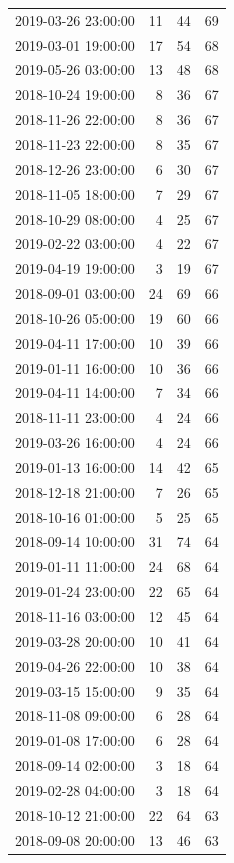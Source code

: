 \begin{tabular}{lrrr}
2019-03-26 23:00:00 & 11 & 44 & 69 \\
2019-03-01 19:00:00 & 17 & 54 & 68 \\
2019-05-26 03:00:00 & 13 & 48 & 68 \\
2018-10-24 19:00:00 & 8 & 36 & 67 \\
2018-11-26 22:00:00 & 8 & 36 & 67 \\
2018-11-23 22:00:00 & 8 & 35 & 67 \\
2018-12-26 23:00:00 & 6 & 30 & 67 \\
2018-11-05 18:00:00 & 7 & 29 & 67 \\
2018-10-29 08:00:00 & 4 & 25 & 67 \\
2019-02-22 03:00:00 & 4 & 22 & 67 \\
2019-04-19 19:00:00 & 3 & 19 & 67 \\
2018-09-01 03:00:00 & 24 & 69 & 66 \\
2018-10-26 05:00:00 & 19 & 60 & 66 \\
2019-04-11 17:00:00 & 10 & 39 & 66 \\
2019-01-11 16:00:00 & 10 & 36 & 66 \\
2019-04-11 14:00:00 & 7 & 34 & 66 \\
2018-11-11 23:00:00 & 4 & 24 & 66 \\
2019-03-26 16:00:00 & 4 & 24 & 66 \\
2019-01-13 16:00:00 & 14 & 42 & 65 \\
2018-12-18 21:00:00 & 7 & 26 & 65 \\
2018-10-16 01:00:00 & 5 & 25 & 65 \\
2018-09-14 10:00:00 & 31 & 74 & 64 \\
2019-01-11 11:00:00 & 24 & 68 & 64 \\
2019-01-24 23:00:00 & 22 & 65 & 64 \\
2018-11-16 03:00:00 & 12 & 45 & 64 \\
2019-03-28 20:00:00 & 10 & 41 & 64 \\
2019-04-26 22:00:00 & 10 & 38 & 64 \\
2019-03-15 15:00:00 & 9 & 35 & 64 \\
2018-11-08 09:00:00 & 6 & 28 & 64 \\
2019-01-08 17:00:00 & 6 & 28 & 64 \\
2018-09-14 02:00:00 & 3 & 18 & 64 \\
2019-02-28 04:00:00 & 3 & 18 & 64 \\
2018-10-12 21:00:00 & 22 & 64 & 63 \\
2018-09-08 20:00:00 & 13 & 46 & 63 \\

\end{tabular}
